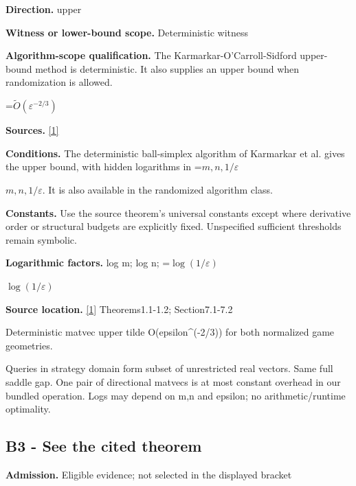 \documentclass[10pt,a4paper]{article}
\newcommand{\AtlasMath}[1]{\par\begingroup\centering\setbox0=\hbox{$\displaystyle #1$}\ifdim\wd0>1.4\linewidth\typeout{ATLAS WIDE FORMULA: \the\wd0}\fi\ifdim\wd0>\linewidth\resizebox{\linewidth}{!}{\box0}\else\box0\fi\par\endgroup}
\newcommand{\AtlasInlineMath}[1]{\begingroup\setbox0=\hbox{$#1$}\ifdim\wd0>.4\linewidth\endgroup\AtlasMath{#1}\else\endgroup$#1$\fi}
\begin{document}
\textbf{Direction.} upper



\textbf{Witness or lower-bound scope.} Deterministic witness



\textbf{Algorithm-scope qualification.} The Karmarkar-O’Carroll-Sidford upper-bound method is deterministic. It also supplies an upper bound when randomization is allowed.



\AtlasMath{\widetilde{O}(\varepsilon^{-2/3})}


\textbf{Sources.} \href{https://arxiv.org/pdf/2601.02347v3}{[1]}



\textbf{Conditions.} The deterministic ball-simplex algorithm of Karmarkar et al. gives the upper bound, with hidden logarithms in \AtlasInlineMath{m,n,1/\varepsilon}. It is also available in the randomized algorithm class.



\textbf{Constants.} Use the source theorem’s universal constants except where derivative order or structural budgets are explicitly fixed. Unspecified sufficient thresholds remain symbolic.



\textbf{Logarithmic factors.} log m; log n; \AtlasInlineMath{\log(1/\varepsilon)}



\textbf{Source location.} \href{https://arxiv.org/pdf/2601.02347v3}{[1]} Theorems1.1-1.2; Section7.1-7.2



Deterministic matvec upper tilde O(epsilon\textasciicircum{}(-2/3)) for both normalized game geometries.



Queries in strategy domain form subset of unrestricted real vectors. Same full saddle gap. One pair of directional matvecs is at most constant overhead in our bundled operation. Logs may depend on m,n and epsilon; no arithmetic/runtime optimality.



\subsection{B3 - See the cited theorem}


\textbf{Admission.} Eligible evidence; not selected in the displayed bracket
\end{document}
